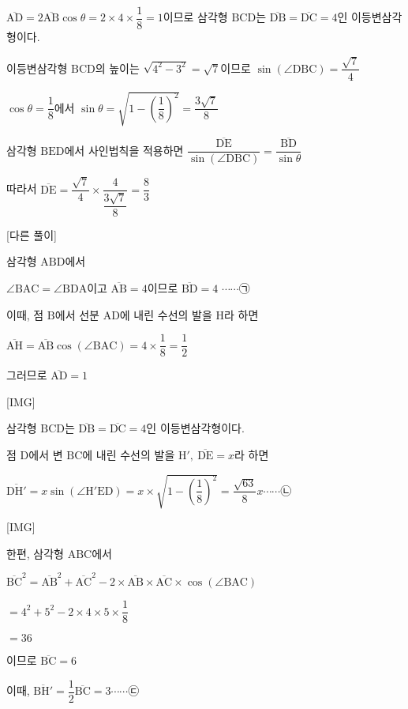 \documentclass{oblivoir}
\begin{document}
$\overline{\mathrm{AD}}=2\overline{\mathrm{AB}}\cos\theta =2\times 4\times\dfrac{1}{8}= 1$이므로 삼각형 $\mathrm{BCD}$는 $\overline{\mathrm{DB}}=\overline{\mathrm{DC}}=4$인 이등변삼각형이다.

이등변삼각형 $\mathrm{BCD}$의 높이는 $\sqrt{4^{2}-3^{2}}=\sqrt{7}$이므로 $\sin(\angle\mathrm{DBC})=\dfrac{\sqrt{7}}{4}$

$\cos\theta =\dfrac{1}{8}$에서 $\sin\theta =\sqrt{1-\left(\dfrac{1}{8}\right)^{2}}=\dfrac{3\sqrt{7}}{8}$

삼각형 $\mathrm{BED}$에서 사인법칙을 적용하면 $\dfrac{\overline{\mathrm{DE}}}{\sin(\angle\mathrm{DBC})}=\dfrac{\overline{\mathrm{BD}}}{\sin\theta}$

따라서 $\overline{\mathrm{DE}}=\dfrac{\sqrt{7}}{4}\times\dfrac{4}{\dfrac{3\sqrt{7}}{8}}=\dfrac{8}{3}$

[다른 풀이]

삼각형 $\mathrm{ABD}$에서

$\angle\mathrm{BAC}=\angle\mathrm{BDA}$이고 $\overline{\mathrm{AB}}=4$이므로 $\overline{\mathrm{BD}}=4$ $\cdots\cdots$㉠

이때, 점 $\mathrm{B}$에서 선분 $\mathrm{AD}$에 내린 수선의 발을 $\mathrm{H}$라 하면

$\overline{\mathrm{AH}}=\overline{\mathrm{AB}}\cos(\angle\mathrm{BAC})=4\times\dfrac{1}{8}=\dfrac{1}{2}$

그러므로 $\overline{\mathrm{AD}}=1$

[IMG]

삼각형 $\mathrm{BCD}$는 $\overline{\mathrm{DB}}=\overline{\mathrm{DC}}=4$인 이등변삼각형이다.

점 $\mathrm{D}$에서 변 $\mathrm{BC}$에 내린 수선의 발을 $\mathrm{H}',\:\overline{\mathrm{DE}}= x$라 하면

$\overline{\mathrm{DH'}}$$=x\sin(\angle\mathrm{H}'\mathrm{ED})$$=x\times\sqrt{1-\left(\dfrac{1}{8}\right)^{2}}$$=\dfrac{\sqrt{63}}{8}x\cdots\cdots$㉡

[IMG]

한편, 삼각형 $\mathrm{ABC}$에서

$\overline{\mathrm{BC}}^{2}$$=\overline{\mathrm{AB}}^{2}+\overline{\mathrm{AC}}^{2}-2\times\overline{\mathrm{AB}}\times\overline{\mathrm{AC}}\times\cos(\angle\mathrm{BAC})$

$=4^{2}+5^{2}-2\times 4\times 5\times\dfrac{1}{8}$

$=36$

이므로 $\overline{\mathrm{BC}}=6$

이때, $\overline{\mathrm{BH'}}=\dfrac{1}{2}\overline{\mathrm{BC}}=3\cdots\cdots$㉢
\end{document}
